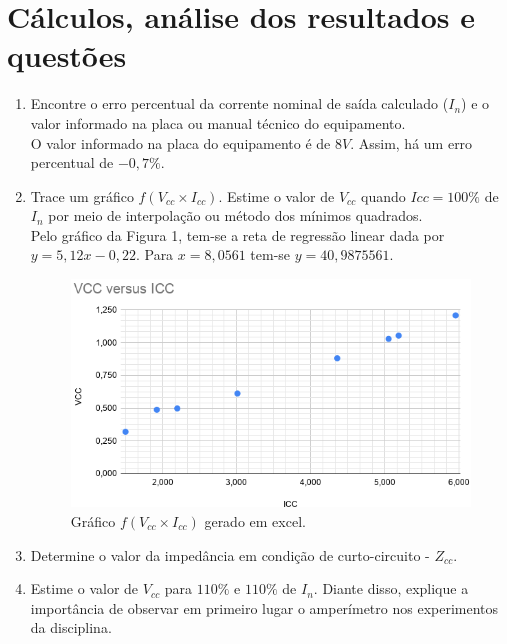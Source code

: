 \documentclass[a4paper,12pt,oneside,openany,table,xcdraw]{article}
\begin{document}
\section{Cálculos, análise dos resultados e questões} %
\begin{enumerate}[1)]
\item Encontre o erro percentual da corrente nominal de saída calculado ($I_n$) e o valor informado na placa ou manual técnico do equipamento.\\
O valor informado na placa do equipamento é de $8V$. Assim, há um erro percentual de $-0,7\%$.

\item Trace um gráfico $f(V_{cc}\times I_{cc})$. Estime o valor de $V_{cc}$ quando $Icc=100\%$ de $I_n$ por meio de interpolação ou método dos mínimos quadrados.\\
Pelo gráfico da Figura 1, tem-se a reta de regressão linear dada por $y=5,12x-0,22$. Para $x=8,0561$ tem-se $y=40,9875561$.

\begin{figure}[H]
\centering
\captionsetup{font=scriptsize}
\includegraphics[width=14.5cm]{graph}
\caption{Gráfico $f(V_{cc}\times I_{cc})$ gerado em excel.}
\label{graph}
\end{figure}

\item Determine o valor da impedância em condição de curto-circuito - $Z_{cc}$.\\

\item Estime o valor de $V_{cc}$ para $110\%$ e $110\%$ de $I_n$. Diante disso, explique a importância de observar em primeiro lugar o amperímetro nos experimentos da disciplina.\\


\end{enumerate}
\end{document}
